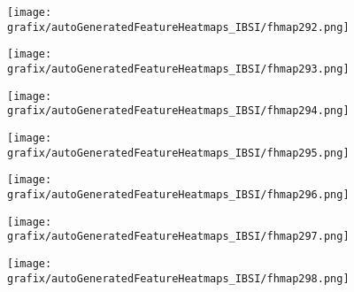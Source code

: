 \begin{subfigure}{\wid\textwidth} 
    \centering 
    \caption{\tiny \sffamily {}} 
    \vspace{\vsp} 
    \texttt{[image: grafix/autoGeneratedFeatureHeatmaps\_IBSI/fhmap292.png]} 
\end{subfigure} 
\hspace{\hsp} 
\begin{subfigure}{\wid\textwidth} 
    \centering 
    \caption{\tiny \sffamily {}} 
    \vspace{\vsp} 
    \texttt{[image: grafix/autoGeneratedFeatureHeatmaps\_IBSI/fhmap293.png]} 
\end{subfigure} 
\hspace{\hsp} 
\begin{subfigure}{\wid\textwidth} 
    \centering 
    \caption{\tiny \sffamily {}} 
    \vspace{\vsp} 
    \texttt{[image: grafix/autoGeneratedFeatureHeatmaps\_IBSI/fhmap294.png]} 
\end{subfigure} 
\hspace{\hsp} 
\begin{subfigure}{\wid\textwidth} 
    \centering 
    \caption{\tiny \sffamily {}} 
    \vspace{\vsp} 
    \texttt{[image: grafix/autoGeneratedFeatureHeatmaps\_IBSI/fhmap295.png]} 
\end{subfigure} 
\hspace{\hsp} 
\begin{subfigure}{\wid\textwidth} 
    \centering 
    \caption{\tiny \sffamily {}} 
    \vspace{\vsp} 
    \texttt{[image: grafix/autoGeneratedFeatureHeatmaps\_IBSI/fhmap296.png]} 
\end{subfigure} 
\hspace{\hsp} 
\begin{subfigure}{\wid\textwidth} 
    \centering 
    \caption{\tiny \sffamily {}} 
    \vspace{\vsp} 
    \texttt{[image: grafix/autoGeneratedFeatureHeatmaps\_IBSI/fhmap297.png]} 
\end{subfigure} 
\hspace{\hsp} 
\begin{subfigure}{\wid\textwidth} 
    \centering 
    \caption{\tiny \sffamily {}} 
    \vspace{\vsp} 
    \texttt{[image: grafix/autoGeneratedFeatureHeatmaps\_IBSI/fhmap298.png]} 
\end{subfigure} 
